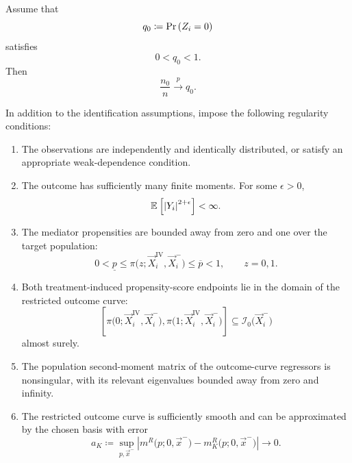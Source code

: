 Assume that
\[
    q_0
    \coloneqq
    \Pr\left( Z_i=0 \right)
\]
satisfies
\[
    0<q_0<1.
\]
Then
\[
    \frac{n_0}{n}
    \overset{p}{\longrightarrow}
    q_0.
    \label{eqn:z0-sample-share}
\]

In addition to the identification assumptions, impose the following regularity conditions:

\begin{enumerate}[label=\textbf{(\arabic*)}]

    \item
    The observations are independently and identically distributed, or satisfy an appropriate weak-dependence condition.

    \item
    The outcome has sufficiently many finite moments.
    For some $\epsilon>0$,
    \[
        \mathbb{E}_{} \left[ 
            \left|
                Y_i
            \right|^{2+\epsilon}
         \right]
        <
        \infty.
    \]

    \item
    The mediator propensities are bounded away from zero and one over the target population:
    \[
        0
        <
        \underline p
        \leq
        \pi
        \big(
            z;
            \vec X_i^{\mathrm{IV}},
            \vec X_i^-
        \big)
        \leq
        \overline p
        <
        1,
        \qquad
        z=0,1.
    \]

    \item
    Both treatment-induced propensity-score endpoints lie in the domain of the restricted outcome curve:
    \[
        \left[
            \pi
            \big(
                0;
                \vec X_i^{\mathrm{IV}},
                \vec X_i^-
            \big),
            \pi
            \big(
                1;
                \vec X_i^{\mathrm{IV}},
                \vec X_i^-
            \big)
        \right]
        \subseteq
        \mathcal I_0
        \big(
            \vec X_i^-
        \big)
    \]
    almost surely.

    \item
    The population second-moment matrix of the outcome-curve regressors is nonsingular, with its relevant eigenvalues bounded away from zero and infinity.

    \item
    The restricted outcome curve is sufficiently smooth and can be approximated by the chosen basis with error
    \[
        a_K
        \coloneqq
        \sup_{
            p,\vec x^-
        }
        \left|
            m^R
            \big(
                p;
                0,
                \vec x^-
            \big)
            -
            m_K^R
            \big(
                p;
                0,
                \vec x^-
            \big)
        \right|
        \longrightarrow
        0.
    \]


\end{enumerate}
